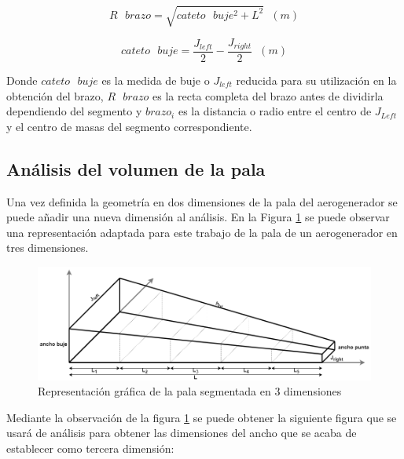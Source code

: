 \begin{equation}
R \text{ } brazo = \sqrt{cateto \text{ } buje^{2} + L^{2}} \hspace{7pt} (m)
\end{equation}

\begin{equation}
cateto \text{ } buje = \dfrac{J_{left}}{2} - \dfrac{J_{right}}{2} \hspace{7pt} (m)
\end{equation}


Donde $cateto \text{ } buje$ es la medida de buje o $J_{left}$ reducida para su utilización en la obtención del brazo, $R \text{ } brazo$ es la recta completa del brazo antes de dividirla dependiendo del segmento y $brazo_i$ es la distancia o radio entre el centro de $J_{Left}$ y el centro de masas del segmento correspondiente.

\subsection{Análisis del volumen de la pala}
\label{section:volumen_pala}

Una vez definida la geometría en dos dimensiones de la pala del aerogenerador se puede añadir una nueva dimensión al análisis. En la Figura \ref{fig:analisis_volumen} se puede observar una representación adaptada para este trabajo de la pala de un aerogenerador en tres dimensiones.

    \begin{figure}[H]
    \centering
    \includegraphics[width=1\textwidth]{images/pala 3d segmentada enorme.png}
    \caption{Representación gráfica de la pala segmentada en 3 dimensiones}
    \label{fig:analisis_volumen}
    \end{figure}

Mediante la observación de la figura \ref{fig:analisis_volumen} se puede obtener la siguiente figura que se usará de análisis para obtener las dimensiones del ancho que se acaba de establecer como tercera dimensión:

